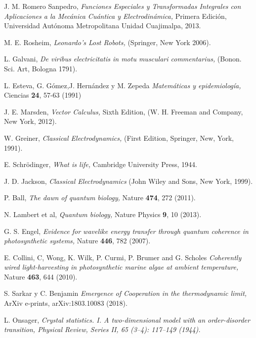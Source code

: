 \documentclass[letterpaper,12pt,oneside]{book}
\begin{document}
 \begin{thebibliography}{99}



J. M. Romero Sanpedro, {\it Funciones Especiales y Transformadas Integrales con Aplicaciones a la Mec\'anica Cu\'antica y Electrodin\'amica,} Primera Edici\'on, Universidad Aut\'onoma Metropolitana Unidad Cuajimalpa, 2013.

M. E. Rosheim, {\it  Leonardo's Lost Robots,} (Springer, New York 2006).

L. Galvani, {\it  De viribus electricitatis in motu musculari commentarius,} (Bonon. Sci. Art, Bologna 1791).

L. Esteva, G. G\'omez,J. Hern\'andez y M. Zepeda {\it Matem\'aticas y epidemiolog\'ia,} Ciencias {\bf 24}, 57-63  (1991)

J. E. Marsden, {\it Vector Calculus,} Sixth Edition, (W. H. Freeman and Company, New York, 2012).

W. Greiner, {\it Classical Electrodynamics,} (First Edition, Springer, New, York, 1991).

E. Schr\"odinger, {\it What is life,} Cambridge University Press, 1944.

J. D. Jackson, {\it  Classical Electrodynamics}  (John Wiley and Sons, New York, 1999).

P. Ball, {\it The dawn of quantum biology,} Nature {\bf 474}, 272  (2011).

N. Lambert et al, {\it Quantum biology,} Nature Physics {\bf 9}, 10  (2013).

G. S. Engel, {\it Evidence for wavelike energy transfer through quantum coherence in photosynthetic systems,} Nature {\bf 446}, 782  (2007).

E. Collini, C, Wong, K. Wilk, P. Curmi, P. Brumer and G. Scholes {\it Coherently wired light-harvesting in photosynthetic marine algae at ambient temperature,} Nature {\bf 463}, 644  (2010).

  S. Sarkar y C. Benjamin {\it Emergence of Cooperation in the thermodynamic limit,} ArXiv e-prints, arXiv:1803.10083 (2018).

 L. Onsager, \it{Crystal statistics. I. A two-dimensional model with an order-disorder transition}, Physical Review, Series II, 65 (3–4): 117–149 (1944).
\end{thebibliography}



  
\end{document}
